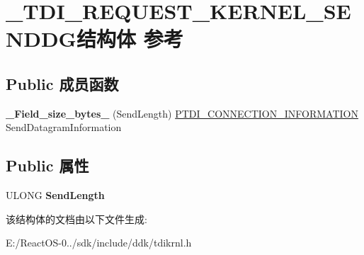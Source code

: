 \hypertarget{struct___t_d_i___r_e_q_u_e_s_t___k_e_r_n_e_l___s_e_n_d_d_g}{}\section{\+\_\+\+T\+D\+I\+\_\+\+R\+E\+Q\+U\+E\+S\+T\+\_\+\+K\+E\+R\+N\+E\+L\+\_\+\+S\+E\+N\+D\+D\+G结构体 参考}
\label{struct___t_d_i___r_e_q_u_e_s_t___k_e_r_n_e_l___s_e_n_d_d_g}
\subsection*{Public 成员函数}
\begin{DoxyCompactItemize}
\item 
\mbox{\label{struct___t_d_i___r_e_q_u_e_s_t___k_e_r_n_e_l___s_e_n_d_d_g_af63269e9522d64dd44394f4e46fef2c3}} 
{\bfseries \+\_\+\+Field\+\_\+size\+\_\+bytes\+\_\+} (Send\+Length) \hyperlink{struct___t_d_i___c_o_n_n_e_c_t_i_o_n___i_n_f_o_r_m_a_t_i_o_n}{P\+T\+D\+I\+\_\+\+C\+O\+N\+N\+E\+C\+T\+I\+O\+N\+\_\+\+I\+N\+F\+O\+R\+M\+A\+T\+I\+ON} Send\+Datagram\+Information
\end{DoxyCompactItemize}
\subsection*{Public 属性}
\begin{DoxyCompactItemize}
\item 
\mbox{\label{struct___t_d_i___r_e_q_u_e_s_t___k_e_r_n_e_l___s_e_n_d_d_g_aae01bb7af2a41d133a14096849ef9273}} 
U\+L\+O\+NG {\bfseries Send\+Length}
\end{DoxyCompactItemize}


该结构体的文档由以下文件生成\+:\begin{DoxyCompactItemize}
\item 
E\+:/\+React\+O\+S-\/0../sdk/include/ddk/tdikrnl.\+h\end{DoxyCompactItemize}
